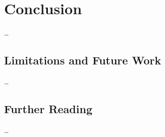 
\chapter{Conclusion} \label{ch:Conclusion}

\dots

\section{Limitations and Future Work}

\dots

\section{Further Reading}

\dots
